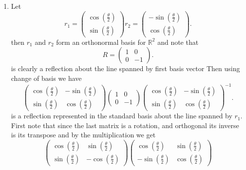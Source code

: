 \documentclass{article}
\begin{document}
    \begin{enumerate}[label = (\alph*)]
        \item 
        Let
        \[
            r_1 = \begin{pmatrix} \cos(\frac{\theta}{2}) \\ \sin(\frac{\theta}{2}) \end{pmatrix} r_2 = \begin{pmatrix} -\sin(\frac{\theta}{2}) \\ \cos(\frac{\theta}{2})\end{pmatrix} 
        .\] 
        then $r_1$ and $r_2$ form an orthonormal basis for $ \mathbb{R}^2$ and note that
        \[
            R = \begin{pmatrix} 1 & 0 \\ 0 & -1 \end{pmatrix} 
        .\] 
        is clearly a reflection about the line spanned by first basis vector
        Then using change of basis we have
        \[
        \begin{pmatrix} 
            \cos(\frac{\theta}{2}) & -\sin(\frac{\theta}{2}) \\
            \sin(\frac{\theta}{2}) & \cos(\frac{\theta}{2})
        \end{pmatrix} 
        \begin{pmatrix} 1 & 0\\ 0 & -1 \end{pmatrix} 
        \begin{pmatrix} 
            \cos(\frac{\theta}{2}) & -\sin(\frac{\theta}{2}) \\
            \sin(\frac{\theta}{2}) & \cos(\frac{\theta}{2})
        \end{pmatrix}^{-1}
        .\] 
        is a reflection represented in the standard basis about the line spanned by $r_1$.
        First note that since the last matrix is a rotation, and orthogonal its inverse is its transpose
        and by the multiplication we get
        \[
            \begin{pmatrix} 
                \cos(\frac{\theta}{2}) & \sin(\frac{\theta}{2})\\
                \sin(\frac{\theta}{2}) & -\cos(\frac{\theta}{2})
            \end{pmatrix}
            \begin{pmatrix} 
                \cos(\frac{\theta}{2}) & \sin(\frac{\theta}{2}) \\
                -\sin(\frac{\theta}{2}) & \cos(\frac{\theta}{2})
            \end{pmatrix}
\]
\end{enumerate}
\end{document}
